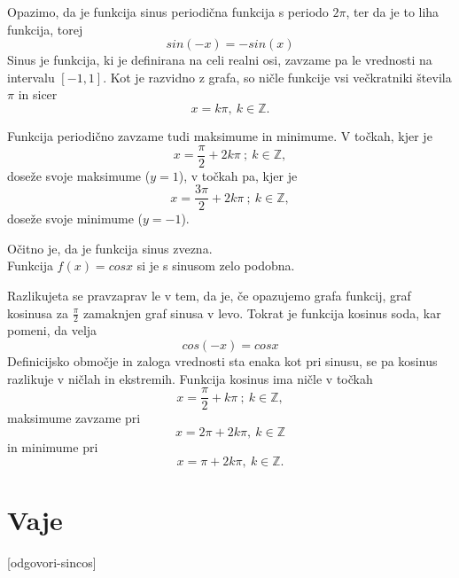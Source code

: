
Opazimo, da je funkcija sinus periodična funkcija s periodo $2\pi$, ter da je to liha funkcija, torej
\[
sin(-x) = -sin(x)
\]
Sinus je funkcija, ki je definirana na celi realni osi, zavzame pa le vrednosti na intervalu $[-1, 1]$. Kot je razvidno z grafa, so ničle funkcije vsi večkratniki števila $\pi$ in sicer 
\[
x = k\pi, \:   k\in \mathbb{Z}.
\]

Funkcija periodično zavzame tudi maksimume in minimume. V točkah, kjer je 
\[
x = \frac{\pi}{2} + 2k\pi \: ; \: k \in \mathbb{Z},
\]
doseže svoje maksimume ($y = 1$), v točkah pa, kjer je  
\[
x = \frac{3\pi}{2} + 2k\pi \: ; \: k \in \mathbb{Z},
\] 
doseže svoje minimume ($y = -1$).

Očitno je, da je funkcija sinus zvezna.\\

Funkcija $f(x) = cosx$ si je s sinusom zelo podobna.

Razlikujeta se pravzaprav le v tem, da je, če opazujemo grafa funkcij, graf kosinusa za $\frac{\pi}{2}$ zamaknjen graf sinusa v levo. Tokrat je funkcija kosinus soda, kar pomeni, da velja
\[
cos(-x) = cosx
\]
Definicijsko območje in zaloga vrednosti sta enaka kot pri sinusu, se pa kosinus razlikuje v ničlah in ekstremih. Funkcija kosinus ima ničle v točkah 
\[
x = \frac{\pi}{2} + k\pi \: ; \: k \in \mathbb{Z},
\]
maksimume zavzame pri
\[
x =2\pi + 2 k\pi, \:   k\in \mathbb{Z}
\]
in minimume pri
\[
x =\pi + 2 k\pi, \:   k\in \mathbb{Z}.
\]


\section{Vaje}
\label{sec:sin-cos-vaje}


\def\datotekaOdgovori{odgovori-sincos}

[\datotekaOdgovori]

%

